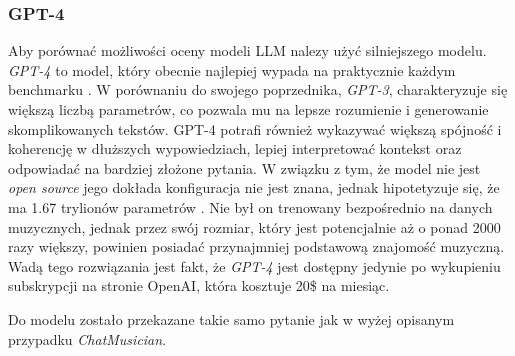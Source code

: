 \documentclass[data-science]{agh-wi} %
\begin{document}
\subsubsection*{GPT-4}
Aby porównać możliwości oceny modeli LLM nalezy użyć silniejszego modelu. \textit{GPT-4} to model, który obecnie najlepiej wypada na praktycznie każdym benchmarku \cite{openai2024gpt4}. W porównaniu do swojego poprzednika, \textit{GPT-3}, charakteryzuje się większą liczbą parametrów, co pozwala mu na lepsze rozumienie i generowanie skomplikowanych tekstów. GPT-4 potrafi również wykazywać większą spójność i koherencję w dłuższych wypowiedziach, lepiej interpretować kontekst oraz odpowiadać na bardziej złożone pytania. W związku z tym, że model nie jest \textit{open source} jego dokłada konfiguracja nie jest znana, jednak hipotetyzuje się, że ma 1.67 trylionów parametrów \cite{leakgpt4}. Nie był on trenowany bezpośrednio na danych muzycznych, jednak przez swój rozmiar, który jest potencjalnie aż o ponad 2000 razy większy, powinien posiadać przynajmniej podstawową znajomość muzyczną. Wadą tego rozwiązania jest fakt, że \textit{GPT-4} jest dostępny jedynie po wykupieniu subskrypcji na stronie OpenAI, która kosztuje 20\$ na miesiąc.

Do modelu zostało przekazane takie samo pytanie jak w wyżej opisanym przypadku \textit{ChatMusician}.
\end{document}

